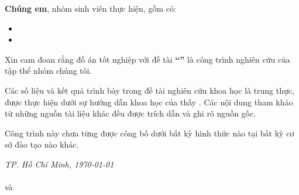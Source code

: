 \frontmatter
\begin{declaration}
\setlength{\parskip}{6pt} %

\textbf{Chúng em}, nhóm sinh viên thực hiện, gồm có:
\begin{itemize}
    \item [1.] \studentname
    \item [2.] \studentnametwo
\end{itemize}

Xin cam đoan rằng đồ án tốt nghiệp với đề tài \textbf{“\titlethesis”} là công trình nghiên cứu của tập thể nhóm chúng tôi.

Các số liệu và kết quả trình bày trong đề tài nghiên cứu khoa học là trung thực, được thực hiện dưới sự hướng dẫn khoa học của thầy \textbf{\supervisor}. Các nội dung tham khảo từ những nguồn tài liệu khác đều được trích dẫn và ghi rõ nguồn gốc.

Công trình này chưa từng được công bố dưới bất kỳ hình thức nào tại bất kỳ cơ sở đào tạo nào khác.

\vspace{2cm}

\begin{flushright}
    \textit{TP. Hồ Chí Minh, \today} \\
     \\[2.5cm]

    \textbf{\studentname} và \textbf{\studentnametwo}\\
\end{flushright}
\end{declaration}
